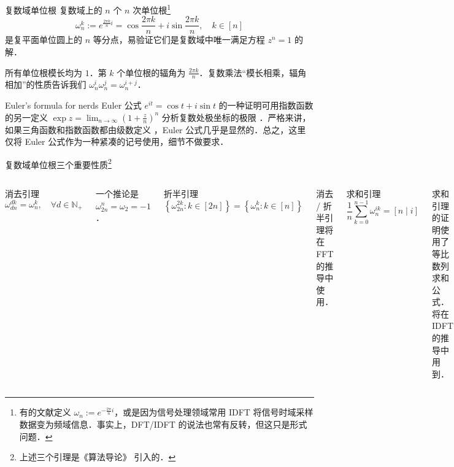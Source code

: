 \documentclass[fontset=fandol]{ctexbeamer}
\begin{document}
\begin{frame}{复数域单位根}
    复数域上的 $n$ 个 $n$ 次单位根\footnote{有的文献定义 $\omega_n := e^{-\frac {2 \pi}{n} i}$，或是因为信号处理领域常用 IDFT 将信号时域采样数据变为频域信息．事实上，DFT/IDFT 的说法也常有反转，但这只是形式问题．}
    \[ \omega_n^k := e^{\frac {2 \pi k}{n} i} = \cos \frac{2 \pi k}{n} + i \sin \frac{2 \pi k}{n},\quad k \in [n] \]
    是复平面单位圆上的 $n$ 等分点，易验证它们是复数域中唯一满足方程 $z^n = 1$ 的解．
    
    所有单位根模长均为 $1$．第 $k$ 个单位根的辐角为 $\frac {2 \pi k}{n}$．复数乘法“模长相乘，辐角相加”的性质告诉我们 $\omega_n^i \omega_n^j = \omega_n^{i+j}$．
    
    \begin{block}{Euler's formula for nerds}
        Euler 公式 $e^{it} = \cos t + i \sin t$ 的一种证明可用指数函数的另一定义 $\exp z = \lim_{n \to \infty} (1+\frac z n)^n$ 分析复数处极坐标的极限 \cite{euler-formula}．严格来讲，如果三角函数和指数函数都由级数定义 \cite{trigonometry}，Euler 公式几乎是显然的．总之，这里仅将 Euler 公式作为一种紧凑的记号使用，细节不做要求．
    \end{block}
\end{frame}

\begin{frame}{复数域单位根}{三个重要性质\footnote{上述三个引理是《算法导论》\cite{algointro} 引入的．}}
    \begin{columns}
        \begin{block}{消去引理}
            \[ \omega_{dn}^{dk} = \omega_n^k,\quad \forall d \in \mathbb N_+\]
        \end{block}
        一个推论是 $\omega_{2n}^n = \omega_2 = -1$．
        \begin{block}{折半引理}
            \[ \left\{ \omega_{2n}^{2k} : k \in [2n] \right\} = \left\{ \omega_n^k : k \in [n] \right\} \]
        \end{block}
        消去 / 折半引理将在 FFT 的推导中使用．
        \begin{block}{求和引理}
        \[  \frac 1 n \sum_{k=0}^{n-1} \omega_n^{ik} = [n \mid i] \]
        \end{block}
        求和引理的证明使用了等比数列求和公式．将在 IDFT 的推导中用到．
    \end{columns}
\end{frame}
\end{document}
